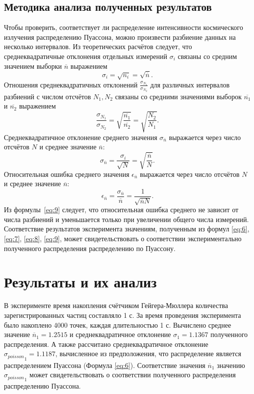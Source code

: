 \documentclass[12pt]{article}
\begin{document}
\subsection{Методика анализа полученных результатов}
Чтобы проверить, соответствует ли распределение интенсивности космического излучения распределению Пуассона, можно произвести разбиение 
данных на несколько интервалов. Из теоретических расчётов \cite{LabBook} следует, что среднеквадратичные отклонения отдельных измерений
$\sigma_i$ связаны со средним значением выборки $\overline{n}$ выражением 
\begin{equation}\label{eq:6}
    \sigma_i = \sqrt{n_i} = \sqrt{\overline{n}}.
\end{equation}
Отношения среднеквадратичных отклонений $\frac{\sigma_{N_1}}{\sigma_{N_2}}$ для различных интервалов разбиений с числом отсчётов 
$N_1, N_2$ связаны со средними значениями выборок $\overline{n_1}$ и $\overline{n_2}$ выражением
\begin{equation}\label{eq:7}
    \frac{\sigma_{N_1}}{\sigma_{N_2}} = \sqrt{\frac{\overline{n_1}}{\overline{n_2}}} = \sqrt{\frac{N_2}{N_1}}.
\end{equation}
Среднеквадратичное отклонение среднего значения $\sigma_{\overline{n}}$ выражается через число отсчётов $N$ и среднее значение 
$\overline{n}$:
\begin{equation}\label{eq:8}
    \sigma_{\overline{n}} = \frac{\sigma_i}{\sqrt{N}} = \sqrt{\frac{\overline{n}}{N}}.
\end{equation}
Относительная ошибка среднего значения $\epsilon_{\overline{n}}$ выражается через число отсчётов $N$ и среднее значение 
$\overline{n}$:
\begin{equation}\label{eq:9}
    \epsilon_{\overline{n}} = \frac{\sigma_{\overline{n}}}{\overline{n}} = \frac{1}{\sqrt{\overline{n}N}}.
\end{equation}
Из формулы~\ref{eq:9} следует, что относительная ошибка среднего не зависит от числа разбиений и уменьшается только при увеличении
общего числа измерений.
Соответствие результатов эксперимента значениям, полученным из формул \ref{eq:6}, \ref{eq:7}, \ref{eq:8}, \ref{eq:9},
может свидетельствовать о соответствии экспериментально полученного распределения распределению по Пуассону. 

\section{Результаты и их анализ}
В эксперименте время накопления счётчиком Гейгера-Мюллера количества зарегистрированных частиц составляло 1 с. За время проведения эксперимента
было накоплено 4000 точек, каждая длительностью 1 с.
Вычислено среднее значение ${\overline{n}}_1 = 1.2515$ и среднеквадратичное отклонение ${\sigma}_1 = 1.1367$ полученного распределения.
А также рассчитано среднеквадратичное отклонение ${\sigma_{poisson}}_1 = 1.1187$, вычисленное из предположения, что распределение является 
распределением Пуассона (Формула \ref{eq:6}). Соответствие значения ${\overline{n}}_1$ значению ${\sigma_{poisson}}_1$ может 
свидетельствовать о соответствии полученного распределения распределению Пуассона.
\end{document}
